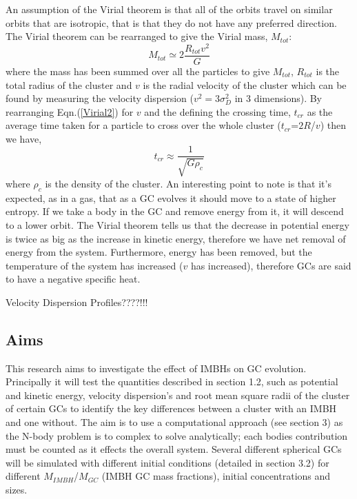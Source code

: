\documentclass{article}
\begin{document}
\begin{multicols}{2}
An assumption of the Virial theorem is that all of the orbits travel on similar orbits that are isotropic, that is that they do not have any preferred direction. The Virial theorem can be rearranged to give the Virial mass, $M_{tot}$:
\begin{equation}
    M_{tot} \simeq 2\frac{R_{tot} v^2}{G}
    \label{Virial2}
\end{equation}
where the mass has been summed over all the particles to give $M_{tot}$, $R_{tot}$ is the total radius of the cluster and $v$ is the radial velocity of the cluster which can be found by measuring the velocity dispersion ($v^2 = 3\sigma_D^2$ in 3 dimensions).
By rearranging Eqn.(\ref{Virial2}) for $v$ and the defining the crossing time, $t_{cr}$ as the average time taken for a particle to cross over the whole cluster ($t_{cr}$=$2R$/$v$) then we have,
\begin{equation}
    t_{cr} \approx \frac{1}{\sqrt{G\rho_c}}
    \label{crossingtime}
\end{equation}
where $\rho_c$ is the density of the cluster. An interesting point to note is that it's expected, as in a gas, that as a GC evolves it should move to a state of higher entropy.  If we take a body in the GC and remove energy from it, it will descend to a lower orbit. The Virial theorem tells us that the decrease in potential energy is twice as big as the increase in kinetic energy, therefore we have net removal of energy from the system. Furthermore, energy has been removed, but the temperature of the system has increased ($v$ has increased), therefore GCs are said to have a negative specific heat.


Velocity Dispersion Profiles????!!!

\subsection{Aims}

This research aims to investigate the effect of IMBHs on GC evolution. Principally it will test the quantities described in section 1.2, such as potential and kinetic energy, velocity dispersion's and root mean square radii of the cluster of certain GCs to identify the key differences between a cluster with an IMBH and one without. The aim is to use a computational approach (see section 3) as the N-body problem is to complex to solve analytically; each bodies contribution must be counted as it effects the overall system. Several different spherical GCs will be simulated with different initial conditions (detailed in section 3.2) for different $M_{IMBH}$/$M_{GC}$ (IMBH GC mass fractions), initial concentrations and sizes. 



\end{multicols}
\end{document}
